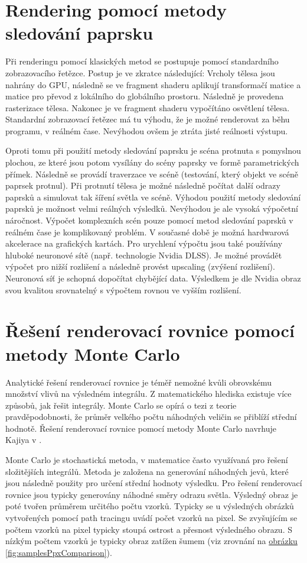 \documentclass[czech,master]{diploma}
\begin{document}
\section{Rendering pomocí metody sledování paprsku}
Při renderingu pomocí klasických metod se postupuje pomocí standardního zobrazovacího řetězce. Postup je ve zkratce následující: Vrcholy tělesa jsou nahrány do GPU, následně se ve fragment shaderu aplikují transformačí matice a matice pro převod z lokálního do globálního prostoru. Následně je provedena rasterizace tělesa. Nakonec je ve fragment shaderu vypočítáno osvětlení tělesa. Standardní zobrazovací řetězec má tu výhodu, že je možné renderovat za běhu programu, v reálném čase. Nevýhodou ovšem je ztráta jisté reálnosti výstupu.\par
Oproti tomu při použití metody sledování paprsku je scéna protnuta s pomyslnou plochou, ze které jsou potom vysílány do scény paprsky ve formě parametrických přímek. Následně se provádí traverzace ve scéně (testování, který objekt ve scéně paprsek protnul). Při protnutí tělesa je možné následně počítat další odrazy paprsků a simulovat tak šíření světla ve scéně. Výhodou použití metody sledování paprsků je možnost velmi reálných výsledků. Nevýhodou je ale vysoká výpočetní náročnost. Výpočet komplexních scén pouze pomocí metod sledování paprsků v reálném čase je komplikovaný problém. V současné době je možná hardwarová akcelerace na grafických kartách. Pro urychlení výpočtu jsou také používány hluboké neuronové sítě (např. technologie Nvidia DLSS). Je možné provádět výpočet pro nižší rozlišení a následně provést upscaling (zvýšení rozlišení). Neuronová síť je schopná dopočítat chybějící data. Výsledkem je dle Nvidia obraz svou kvalitou srovnatelný s výpočtem rovnou ve vyšším rozlišení.

\section{Řešení renderovací rovnice pomocí metody Monte Carlo}
Analytické řešení renderovací rovnice je téměř nemožné kvůli obrovskému množství vlivů na výsledném integrálu. Z matematického hlediska existuje více způsobů, jak řešit integrály. Monte Carlo se opírá o tezi z teorie pravděpodobnosti, že průměr velkého počtu náhodných veličin se přiblíží střední hodnotě. Řešení renderovací rovnice pomocí metody Monte Carlo navrhuje Kajiya v \cite{KajiyaRenderEq}. \par
Monte Carlo je stochastická metoda, v matematice často využívaná pro řešení složitějších integrálů. Metoda je založena na generování náhodných jevů, které jsou následně použity pro určení střední hodnoty výsledku. Pro řešení renderovací rovnice jsou typicky generovány náhodné směry odrazu světla. Výsledný obraz je poté tvořen průměrem určitého počtu vzorků. Typicky se u výsledných obrázků vytvořených pomocí path tracingu uvádí počet vzorků na pixel. Se zvyšujícím se počtem vzorků na pixel typicky stoupá ostrost a přesnost výsledného obrazu. S nízkým počtem vzorků je typicky obraz zatížen šumem (viz zrovnání na \hyperref[fig:samplesPpxCOmparison]{obrázku \ref{fig:samplesPpxComparison}}).
\end{document}

